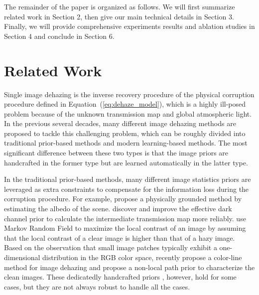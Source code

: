 \documentclass[10pt,twocolumn,letterpaper]{article}
\newcommand{\Eref}[1]{Equation~(\ref{#1})}
\begin{document}
The remainder of the paper is organized as follows. We will first summarize related work in Section 2, then give our main technical details in Section 3. Finally, we will provide comprehensive experiments results and ablation studies in Section 4 and conclude in Section 6.

\section{Related Work}
Single image dehazing is the inverse recovery procedure of the physical corruption procedure defined in \Eref{eq:dehaze_model}, which is a highly ill-posed problem because of the unknown transmission map and global atmospheric light. In the previous several decades, many different image dehazing methods are proposed to tackle this challenging problem, which can be roughly divided into traditional prior-based methods and modern learning-based methods. The most significant difference between these two types is that the image priors are handcrafted in the former type but are learned automatically in the latter type.

In the traditional prior-based methods, many different image statistics priors are leveraged as extra constraints to compensate for the information loss during the corruption procedure. For example, \cite{fattal2008single} propose a physically grounded method by estimating the albedo of the scene. \cite{he2011single,xie2010improved,xu2012fast} discover and improve the effective dark channel prior to calculate the intermediate transmission map more reliably. \cite{tan2008visibility} use Markov Random Field to maximize the local contrast of an image by assuming that the local contrast of a clear image is higher than that of a hazy image.  Based on the observation that small image patches typically exhibit a one-dimensional distribution in the RGB color space, \cite{fattal2014dehazing} recently propose a color-line method for image dehazing and \cite{berman2016non} propose a non-local path prior to characterize the clean images. These dedicatedly handcrafted priors , however, hold for some cases, but they are not always robust to handle all the cases.
\end{document}
